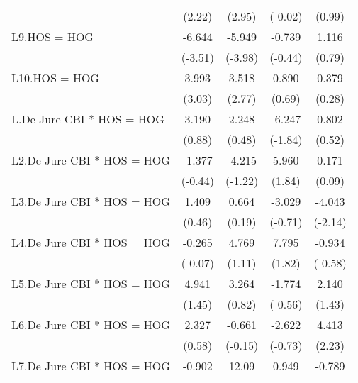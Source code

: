 {\begin{longtable}{l*{4}{c}}
                &   (2.22)         &   (2.95)         &  (-0.02)         &   (0.99)         \\
\addlinespace
L9.HOS = HOG    &   -6.644\sym{***}&   -5.949\sym{***}&   -0.739         &    1.116         \\
                &  (-3.51)         &  (-3.98)         &  (-0.44)         &   (0.79)         \\
\addlinespace
L10.HOS = HOG   &    3.993\sym{**} &    3.518\sym{**} &    0.890         &    0.379         \\
                &   (3.03)         &   (2.77)         &   (0.69)         &   (0.28)         \\
\addlinespace
L.De Jure CBI * HOS = HOG&    3.190         &    2.248         &   -6.247         &    0.802         \\
                &   (0.88)         &   (0.48)         &  (-1.84)         &   (0.52)         \\
\addlinespace
L2.De Jure CBI * HOS = HOG&   -1.377         &   -4.215         &    5.960         &    0.171         \\
                &  (-0.44)         &  (-1.22)         &   (1.84)         &   (0.09)         \\
\addlinespace
L3.De Jure CBI * HOS = HOG&    1.409         &    0.664         &   -3.029         &   -4.043\sym{*}  \\
                &   (0.46)         &   (0.19)         &  (-0.71)         &  (-2.14)         \\
\addlinespace
L4.De Jure CBI * HOS = HOG&   -0.265         &    4.769         &    7.795         &   -0.934         \\
                &  (-0.07)         &   (1.11)         &   (1.82)         &  (-0.58)         \\
\addlinespace
L5.De Jure CBI * HOS = HOG&    4.941         &    3.264         &   -1.774         &    2.140         \\
                &   (1.45)         &   (0.82)         &  (-0.56)         &   (1.43)         \\
\addlinespace
L6.De Jure CBI * HOS = HOG&    2.327         &   -0.661         &   -2.622         &    4.413\sym{*}  \\
                &   (0.58)         &  (-0.15)         &  (-0.73)         &   (2.23)         \\
\addlinespace
L7.De Jure CBI * HOS = HOG&   -0.902         &    12.09         &    0.949         &   -0.789         \\

\end{longtable}}
